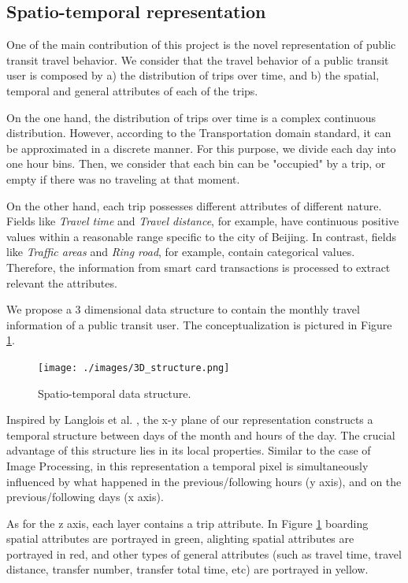 \documentclass{article}
\begin{document}
\subsection{Spatio-temporal representation}
\label{sec:structure}
One of the main contribution of this project is the novel representation of public transit travel behavior. We consider that the travel behavior of a public transit user is composed by a) the distribution of trips over time, and b) the spatial, temporal and general attributes of each of the trips. 

On the one hand, the distribution of trips over time is a complex continuous distribution. However, according to the Transportation domain standard, it can be approximated in a discrete manner. For this purpose, we divide each day into one hour bins. Then, we consider that each bin can be "occupied" by a trip, or empty if there was no traveling at that moment. 

On the other hand, each trip possesses different attributes of different nature. Fields like \textit{Travel time} and \textit{Travel distance}, for example, have continuous positive values within a reasonable range specific to the city of Beijing. In contrast, fields like \textit{Traffic areas} and \textit{Ring road}, for example, contain categorical values. Therefore, the information from smart card transactions is processed to extract relevant the attributes. 

We propose a 3 dimensional data structure to contain the monthly travel information of a public transit user. The conceptualization is pictured in Figure \ref{fig:data_mining/3D_structure}.

\begin{figure}[H]
  \centering
  \texttt{[image: ./images/3D\_structure.png]}
  \caption{Spatio-temporal data structure.}
  \label{fig:data_mining/3D_structure}
\end{figure}

Inspired by Langlois et al. \cite{langlois2016inferring}, the x-y plane of our representation constructs a temporal structure between days of the month and hours of the day. The crucial advantage of this structure lies in its local properties. Similar to the case of Image Processing, in this representation a temporal pixel is simultaneously influenced by what happened in the previous/following hours (y axis), and on the previous/following days (x axis).

As for the z axis, each layer contains a trip attribute. In Figure \ref{fig:data_mining/3D_structure} boarding spatial attributes are portrayed in green, alighting spatial attributes are portrayed in red, and other types of general attributes (such as travel time, travel distance, transfer number, transfer total time, etc) are portrayed in yellow. 
\end{document}
